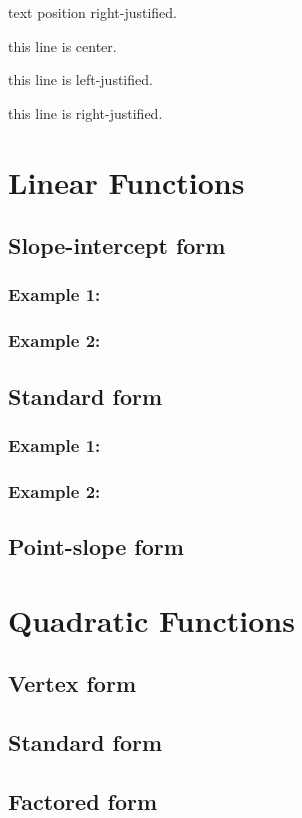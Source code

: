 \documentclass[11pt]{article}
\begin{document}
\begin{flushright}text position right-justified.\end{flushright}





\tiny
this line is center.

this line is left-justified.

this line is right-justified.


\section{Linear Functions}
	\subsection{Slope-intercept form}
		\subsubsection{Example 1:}
		\subsubsection{Example 2:}
	\subsection{Standard form}
		\subsubsection*{Example 1:} %
		\subsubsection*{Example 2:}	
	\subsection{Point-slope form}
\section{Quadratic Functions}
	\subsection{Vertex form}
	\subsection{Standard form}
	\subsection{Factored form}
\end{document}
